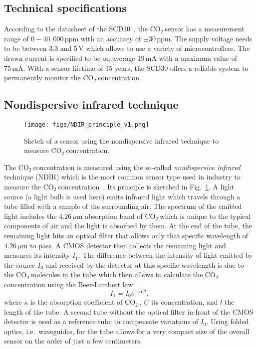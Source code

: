 \documentclass[12pt,a4paper]{article}
\newcommand{\coo}{\ensuremath{\mathrm{CO_2}~}}
\begin{document}
\subsection{Technical specifications}
According to the datasheet of the SCD30~\cite{SENSIRION2020B}, the \coo sensor has a measurement range of $0 - 40,000\,\mathrm{ppm}$ with an accuracy of $\pm 30\,\mathrm{ppm}$.
The supply voltage needs to be between $3.3$ and $5\,\mathrm{V}$ which allows to use a variety of microcontrollers. The drawn current is specified to be on average $19\,\mathrm{mA}$ with a maximum value of $75\,\mathrm{mA}$. With a sensor lifetime of $15$ years, the SCD30 offers a reliable system to permanently monitor the \coo concentration.

\subsection{Nondispersive infrared technique}
\begin{figure}[ht]
\center
\texttt{[image: figs/NDIR\_principle\_v1.png]}
\caption{Sketch of a sensor using the nondispersive infrared technique to measure \coo concentration.}
\label{f:NDIR_sketch}
\end{figure}
The \coo concentration is measured using the so-called \textit{nondispersive infrared} technique (NDIR) which is the most common sensor type used in industry to measure the \coo concentration~\cite{CHEN2003,SHEN2019,PETERSEN2018}. Its principle is sketched in Fig.~\ref{f:NDIR_sketch}. A light source (a light bulb is used here) emits infrared light which travels through a tube filled with a sample of the surrounding air. The spectrum of the emitted light includes the $4.26\,\mu\mathrm{m}$ absorption band of \coo which is unique to the typical components of air and the light is absorbed by them. At the end of the tube, the remaining light hits an optical filter that allows only that specific wavelength of $4.26\,\mu\mathrm{m}$ to pass. A CMOS detector then collects the remaining light and measures its intensity $I_1$. The difference between the intensity of light emitted by the source $I_0$ and received by the detector at this specific wavelength is due to the \coo molecules in the tube which then allows to calculate the \coo concentration using the Beer-Lambert law:
\begin{equation}
I_1 = I_0 e^{-\kappa C l},
\end{equation}
where $\kappa$ is the absorption coefficient of \coo, $C$ its concentration, and $l$ the length of the tube. A second tube without the optical filter in-front of the CMOS detector is used as a reference tube to compensate variations of $I_0$. Using folded optics, i.e.\ waveguides, for the tube allows for a very compact size of the overall sensor on the order of just a few centimeters.
\end{document}
